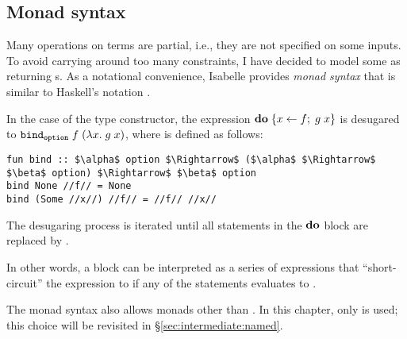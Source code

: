 \subsection{Monad syntax}
\label{sec:terms:prelim:monad}
Many operations on terms are partial, i.e., they are not specified on some inputs.
To avoid carrying around too many constraints, I have decided to model some as returning s.
As a notational convenience, Isabelle provides \emph{monad syntax} that is similar to Haskell's  notation \cite[§3.14]{marlow2010haskell}.%

In the case of the  type constructor, the expression $\mathtt{\mathbf{do}} \;\{ x \leftarrow f;\; g \;x \}$ is desugared to $\texttt{\textup{bind}}_{\texttt{\textup{option}}}\;f\;(\lambda x.\;g\;x)$, where  is defined as follows:
\begin{lstlisting}[language=Isabelle]
fun bind :: $\alpha$ option $\Rightarrow$ ($\alpha$ $\Rightarrow$ $\beta$ option) $\Rightarrow$ $\beta$ option
bind None //f// = None
bind (Some //x//) //f// = //f// //x//
\end{lstlisting}
%
The desugaring process is iterated until all statements in the $\mathtt{\mathbf{do}}$ block are replaced by .

In other words, a  block can be interpreted as a series of  expressions that ``short-circuit'' the expression to  if any of the statements evaluates to .

The monad syntax also allows monads other than .
In this chapter, only  is used; this choice will be revisited in §\ref{sec:intermediate:named}.